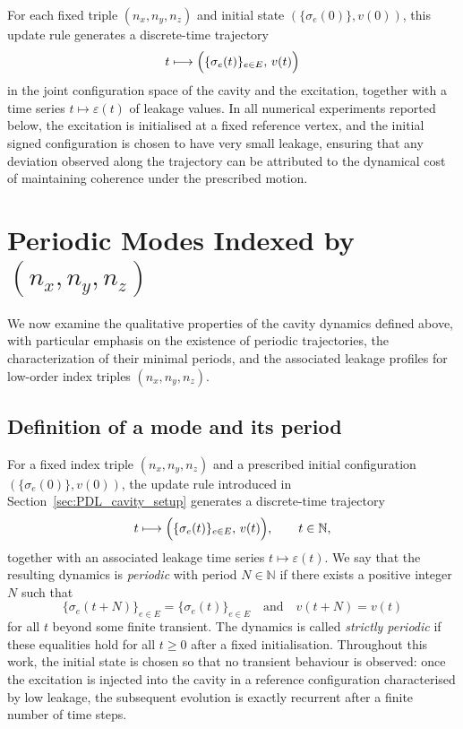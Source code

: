 \documentclass{article}
\theoremstyle{definition}
\begin{document}
For each fixed triple \((n_x,n_y,n_z)\) and initial state \((\{\sigma_e(0)\},v(0))\), this update rule generates a discrete-time trajectory
\[
t \longmapsto \Bigl(\{\sigma_e(t)\}_{e \in E},\, v(t)\Bigr)
\]
in the joint configuration space of the cavity and the excitation, together with a time series \(t \mapsto \varepsilon(t)\) of leakage values.\cite{Topological_Reformulation_PDL_2026} In all numerical experiments reported below, the excitation is initialised at a fixed reference vertex, and the initial signed configuration is chosen to have very small leakage, ensuring that any deviation observed along the trajectory can be attributed to the dynamical cost of maintaining coherence under the prescribed motion.\cite{Effective_Fields_PDL_2026}

\section{Periodic Modes Indexed by \texorpdfstring{$(n_x,n_y,n_z)$}{(n\_x,n\_y,n\_z)}}

We now examine the qualitative properties of the cavity dynamics defined above, with particular emphasis on the existence of periodic trajectories, the characterization of their minimal periods, and the associated leakage profiles for low-order index triples $(n_x,n_y,n_z)$.

\subsection{Definition of a mode and its period}

For a fixed index triple $(n_x,n_y,n_z)$ and a prescribed initial configuration $(\{\sigma_e(0)\},v(0))$, the update rule introduced in Section~\ref{sec:PDL_cavity_setup} generates a discrete-time trajectory
\[
t \longmapsto \Bigl(\{\sigma_e(t)\}_{e \in E},\, v(t)\Bigr),\qquad t \in \mathbb{N},
\]
together with an associated leakage time series $t \mapsto \varepsilon(t)$.\cite{Effective_Fields_PDL_2026} We say that the resulting dynamics is \emph{periodic} with period $N \in \mathbb{N}$ if there exists a positive integer $N$ such that
\[
\{\sigma_e(t+N)\}_{e \in E} = \{\sigma_e(t)\}_{e \in E}
\quad\text{and}\quad
v(t+N) = v(t)
\]
for all $t$ beyond some finite transient. The dynamics is called \emph{strictly periodic} if these equalities hold for all $t \ge 0$ after a fixed initialisation.\cite{Topological_Reformulation_PDL_2026} Throughout this work, the initial state is chosen so that no transient behaviour is observed: once the excitation is injected into the cavity in a reference configuration characterised by low leakage, the subsequent evolution is exactly recurrent after a finite number of time steps.
\end{document}
